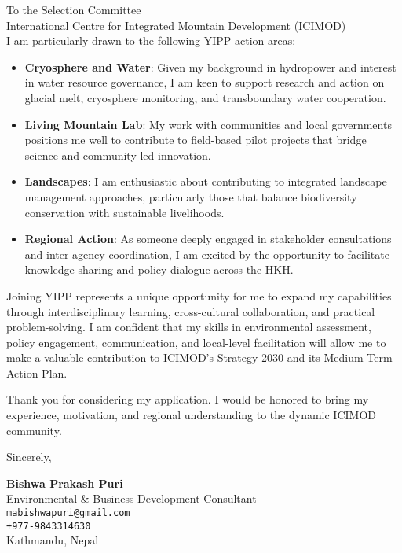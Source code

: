 \documentclass[11pt]{letter}
\begin{document}
\begin{letter}{To the Selection Committee\\
International Centre for Integrated Mountain Development (ICIMOD)\\}
I am particularly drawn to the following YIPP action areas:

\begin{itemize}
  \item \textbf{Cryosphere and Water}: Given my background in hydropower and interest in water resource governance, I am keen to support research and action on glacial melt, cryosphere monitoring, and transboundary water cooperation.
  
  \item \textbf{Living Mountain Lab}: My work with communities and local governments positions me well to contribute to field-based pilot projects that bridge science and community-led innovation.
  
  \item \textbf{Landscapes}: I am enthusiastic about contributing to integrated landscape management approaches, particularly those that balance biodiversity conservation with sustainable livelihoods.
  
  \item \textbf{Regional Action}: As someone deeply engaged in stakeholder consultations and inter-agency coordination, I am excited by the opportunity to facilitate knowledge sharing and policy dialogue across the HKH.
\end{itemize}

Joining YIPP represents a unique opportunity for me to expand my capabilities through interdisciplinary learning, cross-cultural collaboration, and practical problem-solving. I am confident that my skills in environmental assessment, policy engagement, communication, and local-level facilitation will allow me to make a valuable contribution to ICIMOD’s Strategy 2030 and its Medium-Term Action Plan.

Thank you for considering my application. I would be honored to bring my experience, motivation, and regional understanding to the dynamic ICIMOD community.

\closing{Sincerely,}

\vspace{1em}
\noindent
\textbf{Bishwa Prakash Puri} \\
Environmental \& Business Development Consultant \\
\texttt{mabishwapuri@gmail.com} \\
\texttt{+977-9843314630} \\
Kathmandu, Nepal

\end{letter}
\end{document}
